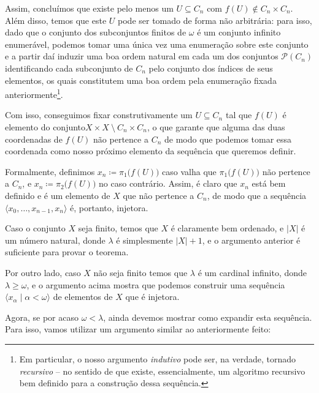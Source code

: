 \documentclass{hipatia}
\newcommand{\partes}[1]{\mathcal{P}(#1)}
\newcommand{\subs}{\subseteq}
\begin{document}
Assim, concluímos que existe pelo menos um $U\subs C_n$
com $f(U)\notin C_n\times C_n$. Além disso, temos que este
$U$ pode ser tomado de forma não arbitrária: para isso,
dado que o conjunto dos subconjuntos finitos de $\omega$ é
um conjunto infinito enumerável, podemos tomar uma única
vez uma enumeração sobre este conjunto e a partir daí
induzir uma boa ordem natural em cada um dos conjuntos
$\partes{C_n}$ identificando cada subconjunto de $C_n$
pelo conjunto dos índices de seus elementos, os quais
constitutem uma boa ordem pela enumeração fixada
anteriormente\footnote{Em particular, o nosso argumento
{\it indutivo} pode ser, na verdade, tornado {\it
recursivo} -- no sentido de que existe, essencialmente,
um algoritmo recursivo bem definido para a construção
dessa sequência.}.

Com isso, conseguimos fixar construtivamente um $U\subs
C_n$ tal que $f(U)$ é elemento do conjunto\linebreak $X\times
X~\setminus~C_n\times C_n$, o que garante que alguma das
duas coordenadas de $f(U)$ não pertence a $C_n$ de modo
que podemos tomar essa coordenada como nosso próximo
elemento da sequência que queremos definir.

Formalmente, definimos $x_n\coloneq\pi_1\big(f(U)\big)$ caso
valha que $\pi_1\big(f(U)\big)$ não pertence a $C_n$, e
$x_n\coloneq\pi_2\big(f(U)\big)$ no caso contrário. Assim, é
claro que $x_n$ está bem definido e é um elemento de $X$
que não pertence a $C_n$, de modo que a sequência $\langle
x_0, \ldots, x_{n-1}, x_n\rangle$ é, portanto, injetora.

Caso o conjunto $X$ seja finito, temos que $X$ é
claramente bem ordenado, e $|X|$ é um número natural,
donde $\lambda$ é simplesmente $|X|+1$, e o argumento
anterior é suficiente para provar o teorema.

Por outro lado, caso $X$ não seja finito temos que
$\lambda$ é um cardinal infinito, donde
$\lambda\geq\omega$, e o argumento acima mostra que
podemos construir uma sequência $\langle
x_\alpha\mid\alpha<\omega\rangle$ de elementos de $X$ que
é injetora.

Agora, se por acaso $\omega<\lambda$, ainda devemos
mostrar como expandir esta sequência. Para isso, vamos
utilizar um argumento similar ao anteriormente feito:
\end{document}
